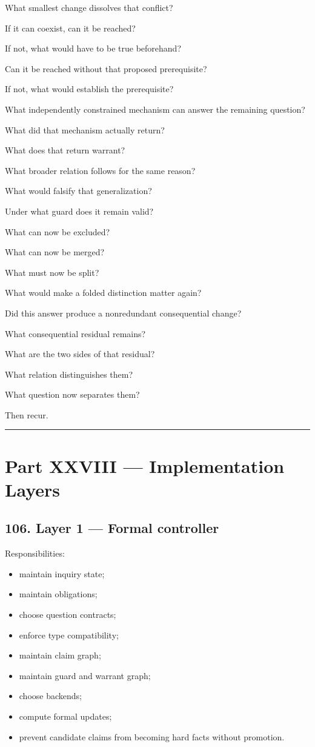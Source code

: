 \documentclass[
]{article}
\providecommand{\tightlist}{%
  \setlength{\itemsep}{0pt}\setlength{\parskip}{0pt}}
\begin{document}
What smallest change dissolves that conflict?

If it can coexist, can it be reached?

If not, what would have to be true beforehand?

Can it be reached without that proposed prerequisite?

If not, what would establish the prerequisite?

What independently constrained mechanism can answer the remaining
question?

What did that mechanism actually return?

What does that return warrant?

What broader relation follows for the same reason?

What would falsify that generalization?

Under what guard does it remain valid?

What can now be excluded?

What can now be merged?

What must now be split?

What would make a folded distinction matter again?

Did this answer produce a nonredundant consequential change?

What consequential residual remains?

What are the two sides of that residual?

What relation distinguishes them?

What question now separates them?

Then recur.

\begin{center}\rule{0.5\linewidth}{0.5pt}\end{center}

\section{Part XXVIII --- Implementation
Layers}\label{part-xxviii-implementation-layers}

\subsection{106. Layer 1 --- Formal
controller}\label{layer-1-formal-controller}

Responsibilities:

\begin{itemize}
\tightlist
\item
  maintain inquiry state;
\item
  maintain obligations;
\item
  choose question contracts;
\item
  enforce type compatibility;
\item
  maintain claim graph;
\item
  maintain guard and warrant graph;
\item
  choose backends;
\item
  compute formal updates;
\item
  prevent candidate claims from becoming hard facts without promotion.
\end{itemize}
\end{document}
